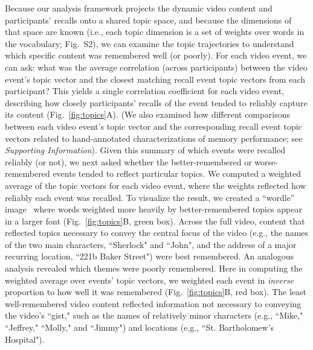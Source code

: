 \documentclass{article}
\newcommand{\topics}{S2}
\begin{document}
Because our analysis framework projects the dynamic video content and participants' recalls onto a shared topic space, and because the dimensions of that space are known (i.e., each topic dimension is a set of weights over words in the vocabulary; Fig.~\topics), we can examine the topic trajectories to understand which specific content was remembered well (or poorly).  For each video event, we can ask: what was the average correlation (across participants) between the video event's topic vector and the closest matching recall event topic vectors from each participant? This yields a single correlation coefficient for each video event, describing how closely participants' recalls of the event tended to reliably capture its content (Fig.~\ref{fig:topics}A).  (We also examined how different comparisons between each video event's topic vector and the corresponding recall event topic vectors related to hand-annotated characterizations of memory performance; see \textit{Supporting Information}).  Given this summary of which events were recalled reliably (or not), we next asked whether the better-remembered or worse-remembered events tended to reflect particular topics.  We computed a weighted average of the topic vectors for each video event, where the weights reflected how reliably each event was recalled.  To visualize the result, we created a ``wordle'' image~\citep{MuelEtal18} where words weighted more heavily by better-remembered topics appear in a larger font (Fig.~\ref{fig:topics}B, green box).  Across the full video, content that reflected topics necessary to convey the central focus of the video (e.g., the names of the two main characters, ``Sherlock" and ``John", and the address of a major recurring location, ``221b Baker Street") were best remembered.  An analogous analysis revealed which themes were poorly remembered.  Here in computing the weighted average over events' topic vectors, we weighted each event in \textit{inverse} proportion to how well it was remembered (Fig.~\ref{fig:topics}B, red box).  The least well-remembered video content reflected information not necessary to conveying the video's ``gist," such as the names of relatively minor characters (e.g., ``Mike," ``Jeffrey," ``Molly," and ``Jimmy") and locations (e.g., ``St. Bartholomew's Hospital").
\end{document}
